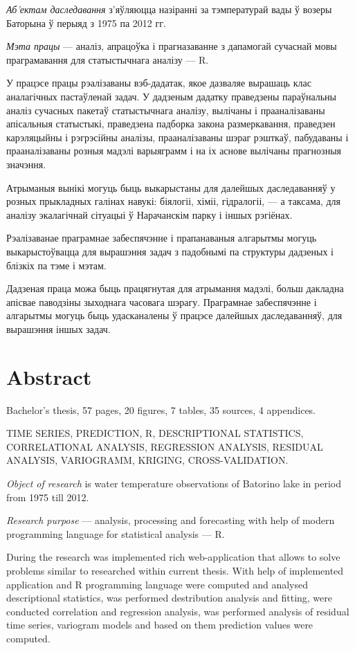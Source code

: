 \textit{Аб'ектам даследавання} з'яўляюцца назіранні за тэмпературай вады ў возеры Баторына ў перыяд з 1975 па 2012 гг.

\textit{Мэта працы} --- аналіз, апрацоўка і прагназаванне з дапамогай сучаснай мовы праграмавання для статыстычнага аналізу --- R.

У працэсе працы рэалізаваны вэб-дадатак, якое дазваляе вырашаць клас аналагічных пастаўленай задач. У дадзеным дадатку праведзены параўнальны аналіз сучасных пакетаў статыстычнага аналізу, вылічаны і прааналізаваны апісальныя статыстыкі, праведзена падборка закона размеркавання, праведзен карэляцыйны і рэгрэсійны аналізы, прааналізаваны шэраг рэшткаў, пабудаваны і прааналізаваны розныя мадэлі варыяграмм і на іх аснове вылічаны прагнозныя значэння.

Атрыманыя вынікі могуць быць выкарыстаны для далейшых даследаванняў у розных прыкладных галінах навукі: біялогіі, хіміі, гідралогіі, --- а таксама, для аналізу экалагічнай сітуацыі ў Нарачанскім парку і іншых рэгіёнах.

Рэалізаванае праграмнае забеспячэнне і прапанаваныя алгарытмы могуць выкарыстоўвацца для вырашэння задач з падобнымі па структуры дадзеных і блізкіх па тэме і мэтам.

Дадзеная праца можа быць працягнутая для атрымання мадэлі, больш дакладна апісвае паводзіны зыходнага часовага шэрагу. Праграмнае забеспячэнне і алгарытмы могуць быць удасканалены ў працэсе далейшых даследаванняў, для вырашэння іншых задач.

\newpage

\chapter*{Abstract}
Bachelor's thesis, 57 pages, 20 figures, 7 tables, 35 sources, 4 appendices.

TIME SERIES, PREDICTION, R, DESCRIPTIONAL STATISTICS, CORRELATIONAL ANALYSIS, REGRESSION ANALYSIS, RESIDUAL ANALYSIS, VARIOGRAMM, KRIGING, CROSS-VALIDATION.

\textit{Object of research} is water temperature observations of Batorino lake in period from 1975 till 2012.

\textit{Research purpose} --- analysis, processing and forecasting with help of modern programming language for statistical analysis --- R.

During the research was implemented rich web-application that allows to solve problems similar to researched within current thesis. With help of implemented application and R programming language were computed and analysed descriptional statistics, was performed destribution analysis and fitting, were conducted correlation and regression analysis, was performed analysis of residual time series, variogram models and based on them prediction values were computed.

